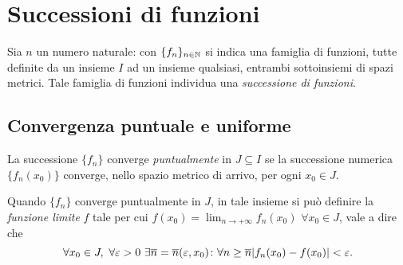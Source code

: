 \chapter{Successioni di funzioni}
Sia $n$ un numero naturale: con $\{f_n\}_{n\in\mathbb{N}}$ si indica una famiglia di funzioni, tutte definite da un insieme $I$ ad un insieme qualsiasi, entrambi sottoinsiemi di spazi metrici. Tale famiglia di funzioni individua una \emph{successione di funzioni}.
\section{Convergenza puntuale e uniforme}
\begin{definizione} \label{d:conv_puntuale_succ}
La successione $\{f_n\}$ converge \emph{puntualmente} in $J\subseteq I$ se la successione numerica $\{f_n(x_0)\}$ converge, nello spazio metrico di arrivo, per ogni $x_0\in J$.
\end{definizione}
Quando $\{f_n\}$ converge puntualmente in $J$, in tale insieme si può definire la \emph{funzione limite} $f$ tale per cui $f(x_0)=\lim_{n\to+\infty}f_n(x_0)$ $\forall x_0\in J$, vale a dire che
\begin{equation} \label{eq:conv_puntuale_succ}
\forall x_0\in J,\ \forall\epsilon>0\ \exists\overline{n}=\overline{n}(\epsilon,x_0)\colon\forall n\geq\overline{n}\abs{f_n(x_0)-f(x_0)}<\epsilon.
\end{equation}
